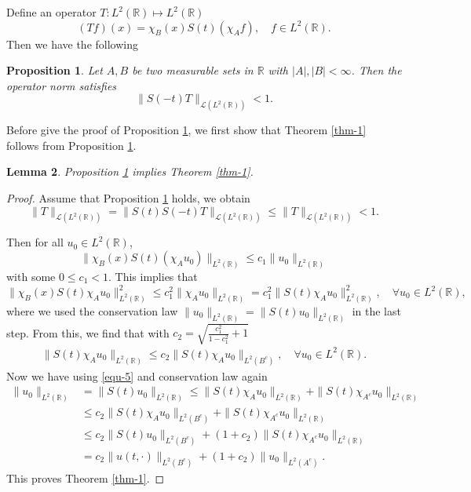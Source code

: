 \documentclass[12pt]{amsart}
\def\R {\mathbb{R}}
\newtheorem{proposition}{Proposition}[section]
\newtheorem{lemma}[proposition]{Lemma}
\theoremstyle{definition}
\numberwithin{equation}{section}
\begin{document}
Define an operator $T:L^2(\R) \mapsto L^2(\R)$
$$
(Tf)(x)=\chi_B(x)S(t)(\chi_Af), \quad f\in L^2(\R).
$$
Then we have the following
\begin{proposition}\label{prop-1}
Let $A,B$ be two measurable sets in $\R$ with $|A|,|B|<\infty$. Then the operator norm satisfies
$$
\|S(-t)T\|_{\mathcal {L}(L^2(\R))}<1.
$$
\end{proposition}

Before give the proof of Proposition \ref{prop-1}, we first show that Theorem \ref{thm-1} follows from Proposition \ref{prop-1}.
\begin{lemma}
Proposition \ref{prop-1} implies Theorem \ref{thm-1}.
\end{lemma}
\begin{proof}
Assume that Proposition \ref{prop-1} holds, we obtain
$$
\| T\|_{\mathcal{L}(L^2(\mathbb{R}))}=\|S(t)S(-t)T\|_{\mathcal{L}(L^2(\mathbb{R}))} \le \|T\|_{\mathcal{L}(L^2(\mathbb{R}))}<1. 
$$

Then for all $u_0\in L^2(\R)$,
$$
\|\chi_B(x)S(t)(\chi_Au_0)\|_{L^2(\R)}\leq c_1\|u_0\|_{L^2(\R)}
$$
with some $0\leq c_1<1$. This implies that
 $$
\|\chi_B(x)S(t) \chi_Au_0\|^2_{L^2(\R)}\leq c_1^2\|\chi_Au_0\|_{L^2(\R)}=c_1^2\|S(t) \chi_Au_0\|^2_{L^2(\R)}, \quad \forall u_0\in L^2(\R),
$$
where we used  the conservation law $\|u_0\|_{L^2(\R)}=\|S(t)u_0\|_{L^2(\R)}$ in the last step. From this, we find
 that with  $c_2=\sqrt{\frac{c_1^2}{1-c_1^2}+1}$
\begin{align}\label{equ-5}
 \|S(t) \chi_Au_0\|_{L^2(\R)}\leq c_2\|S(t) \chi_Au_0\|_{L^2(B^c)}, \quad \forall u_0\in L^2(\R).
\end{align}
Now we have using \eqref{equ-5} and conservation law again
\begin{align*}
\|u_0\|_{L^2(\R)} &= \|S(t)u_0\|_{L^2(\R)}\leq \|S(t) \chi_Au_0\|_{L^2(\R)}+\|S(t) \chi_{A^c}u_0\|_{L^2(\R)}\\
&\leq c_2\|S(t) \chi_Au_0\|_{L^2(B^c)}+\|S(t) \chi_{A^c}u_0\|_{L^2(\R)}\\
&\leq c_2\|S(t)u_0\|_{L^2(B^c)}+(1+c_2)\|S(t) \chi_{A^c}u_0\|_{L^2(\R)}\\
&=c_2\|u(t,\cdot)\|_{L^2(B^c)}+(1+c_2)\|u_0\|_{L^2(A^c)}.
\end{align*}
This proves Theorem \ref{thm-1}.
\end{proof}
\end{document}
